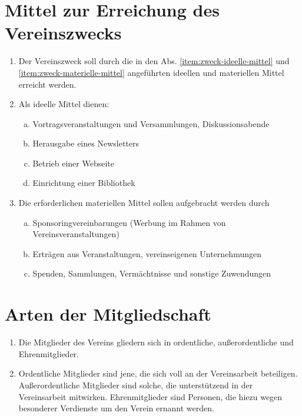 \documentclass[a4paper,12pt]{article}
\begin{document}
\section{Mittel zur Erreichung des Vereinszwecks} %
\label{sec:Mittel}
\begin{enumerate}
\item Der Vereinszweck soll durch die in den Abs. \ref{item:zweck-ideelle-mittel} und \ref{item:zweck-materielle-mittel} angeführten ideellen und materiellen Mittel erreicht werden.
\item\label{item:zweck-ideelle-mittel} Als ideelle Mittel dienen:
 \begin{enumerate}[(a)]
 \item Vortragsveranstaltungen und Versammlungen, Diskussionsabende
 \item Herausgabe eines Newsletters
 \item Betrieb einer Webseite
 \item Einrichtung einer Bibliothek
 \end{enumerate} 
\item\label{item:zweck-materielle-mittel} Die erforderlichen materiellen Mittel sollen aufgebracht werden durch
 \begin{enumerate}[(a)]
 \item Sponsoringvereinbarungen (Werbung im Rahmen von Vereinsveranstaltungen)
 \item Erträgen aus Veranstaltungen, vereinseigenen Unternehmungen
 \item Spenden, Sammlungen, Vermächtnisse und sonstige Zuwendungen
 \end{enumerate} 
\end{enumerate}

\section{Arten der Mitgliedschaft} %
\label{sec:Mitgliedschaft-Arten}
\begin{enumerate}
\item Die Mitglieder des Vereins gliedern sich in ordentliche, außerordentliche und Ehrenmitglieder.
\item Ordentliche Mitglieder sind jene, die sich voll an der Vereinsarbeit beteiligen. Außerordentliche Mitglieder sind solche, die unterstützend in der Vereinsarbeit mitwirken. Ehrenmitglieder sind Personen, die hiezu wegen besonderer Verdienste um den Verein ernannt werden.
\end{enumerate}
\end{document}
